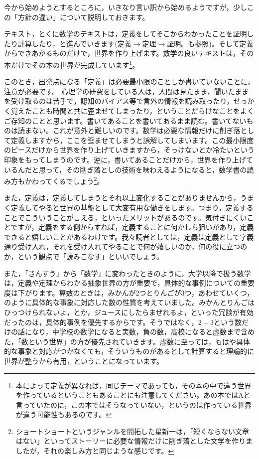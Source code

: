 今から始めようとするところに，いきなり言い訳から始めるようですが，少しこの「方針の違い」について説明しておきます。

テキスト，とくに数学のテキストは，定義をしてそこからわかったことを証明したり計算したり，と進んでいきます(定義$\to$定理$\to$証明。\textcite{TakeyamaYoshihiro}も参照)。そして定義からできあがるものだけで，世界を作り上げます。数学の良いテキストは，その本だけでその本の世界が完成しています\footnote{本によって定義が異なれば，同じテーマであっても，その本の中で違う世界を作っているということもあることにも注意してください。あの本ではAと言っていたのに，この本ではそうなっていない，というのは作っている世界が違う可能性もあるのです。}。

このとき，出発点になる「定義」は必要最小限のことしか書いていないことに，注意が必要です。
心理学の研究をしている人は，人間は見たまま，聞いたままを受け取るのは苦手で，認知のバイアス等で言外の情報を読み取ったり，せっかく覚えたことも時間と共に歪ませてしまったり，ということだらけなことをよくご存知のことと思います。書いてあることを書いてあるまま読む。書いてないものは読まない。これが意外と難しいのです。数学は必要な情報だけに削ぎ落として定義しますから，ここを歪ませてしまうと誤解してしまいます。この最小限度のピースだけから世界を作り上げていきますから，そっけないとか冷たいという印象をもってしまうのです。逆に，書いてあることだけから，世界を作り上げているんだと思って，その削ぎ落としの技術を味わえるようになると，数学書の読み方もかわってくるでしょう\footnote{ショートショートというジャンルを開拓した星新一は，「短くならない文章はない」といってストーリーに必要な情報だけに削ぎ落とした文学を作りましたが，それの楽しみ方と同じような感じです。}。

また，定義は，定義してしまうとそれ以上変化することがありませんから，うまく定義してやると世界の基盤として大変有用な働きをします。つまり，定義することでこういうことが言える，といったメリットがあるのです。気付きにくいことですが，定義をする側からすれば，定義することに何かしら狙いがあり，定義できると嬉しいことがあるわけです。我々読者としては，定義は定義として字義通り受け入れ，それを受け入れてやることで何が嬉しいのか，何の役に立つのか，という観点で「読みこなす」といいでしょう。

また，「さんすう」から「数学」に変わったときのように，大学以降で扱う数学は，定義や定理からわかる抽象世界の方が重要で，具体的な事例についての重要度は下がります。算数のときは，みかんが2つとりんごが3つ，あわせていくつ，のように具体的な事象に対応した数の性質を考えていました。みかんとりんごはひっつけられないよ，とか，ジュースにしたらまぜれるよ，といった冗談が有効だったのは，具体的事例を優先するからです。そうではなく，$2+3$という数だけの話になり，中学校の数学になると実数，負の数，高校になると虚数まで含めた，「数という世界」の方が優先されていきます。虚数に至っては，もはや具体的な事象と対応がつかなくても，そういうものがあるとして計算すると理論的に世界が整うから有用，ということになっています。


